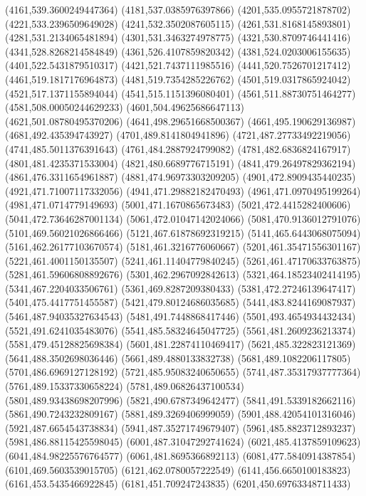 {(4161,539.3600249447364)
(4181,537.0385976397866)
(4201,535.0955721878702)
(4221,533.2396509649028)
(4241,532.3502087605115)
(4261,531.8168145893801)
(4281,531.2134065481894)
(4301,531.3463274978775)
(4321,530.8709746441416)
(4341,528.8268214584849)
(4361,526.4107859820342)
(4381,524.0203006155635)
(4401,522.5431879510317)
(4421,521.7437111985516)
(4441,520.7526701217412)
(4461,519.1817176964873)
(4481,519.7354285226762)
(4501,519.0317865924042)
(4521,517.1371155894044)
(4541,515.1151396080401)
(4561,511.88730751464277)
(4581,508.00050244629233)
(4601,504.49625686647113)
(4621,501.08780495370206)
(4641,498.29651668500367)
(4661,495.190629136987)
(4681,492.435394743927)
(4701,489.8141804941896)
(4721,487.27733492219056)
(4741,485.5011376391643)
(4761,484.2887924799082)
(4781,482.6836824167917)
(4801,481.4235371533004)
(4821,480.6689776715191)
(4841,479.26497829362194)
(4861,476.3311654961887)
(4881,474.96973303209205)
(4901,472.8909435440235)
(4921,471.71007117332056)
(4941,471.29882182470493)
(4961,471.0970495199264)
(4981,471.0714779149693)
(5001,471.1670865673483)
(5021,472.4415282400606)
(5041,472.73646287001134)
(5061,472.01047142024066)
(5081,470.9136012791076)
(5101,469.56021026866466)
(5121,467.61878692319215)
(5141,465.6443068075094)
(5161,462.26177103670574)
(5181,461.3216776060667)
(5201,461.35471556301167)
(5221,461.4001150135507)
(5241,461.11404779840245)
(5261,461.47170633763875)
(5281,461.59606808892676)
(5301,462.2967092842613)
(5321,464.18523402414195)
(5341,467.2204033506761)
(5361,469.8287209380433)
(5381,472.27246139647417)
(5401,475.4417751455587)
(5421,479.80124686035685)
(5441,483.8244169087937)
(5461,487.94035327634543)
(5481,491.7448868417446)
(5501,493.4654934432434)
(5521,491.6241035483076)
(5541,485.58324645047725)
(5561,481.2609236213374)
(5581,479.45128825698384)
(5601,481.22874110469417)
(5621,485.322823121369)
(5641,488.3502698036446)
(5661,489.4880133832738)
(5681,489.1082206117805)
(5701,486.6969127128192)
(5721,485.95083240650655)
(5741,487.35317937777364)
(5761,489.15337330658224)
(5781,489.06826437100534)
(5801,489.93438698207996)
(5821,490.6787349642477)
(5841,491.5339182662116)
(5861,490.7243232809167)
(5881,489.3269406999059)
(5901,488.42054101316046)
(5921,487.6654543738834)
(5941,487.35271749679407)
(5961,485.8823712893237)
(5981,486.88115425598045)
(6001,487.31047292741624)
(6021,485.4137859109623)
(6041,484.98225576764577)
(6061,481.8695366892113)
(6081,477.5840914387854)
(6101,469.5603539015705)
(6121,462.0780057222549)
(6141,456.6650100183823)
(6161,453.5435466922845)
(6181,451.709247243835)
(6201,450.69763348711433)
}
